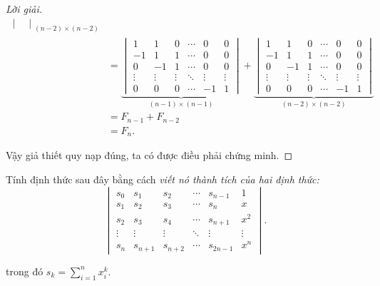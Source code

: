 \documentclass[class=nhvh-linear-algebra,crop=false]{standalone}
\begin{document}
\begin{proof}[Lời giải]
\begin{align*}
{\begin{vmatrix}
			            \end{vmatrix}}_{(n-2)\times (n-2)} \\
		 & =
		\underbrace{\begin{vmatrix}
				            1      & 1      & 0      & \cdots & 0      & 0      \\
				            -1     & 1      & 1      & \cdots & 0      & 0      \\
				            0      & -1     & 1      & \cdots & 0      & 0      \\
				            \vdots & \vdots & \vdots & \ddots & \vdots & \vdots \\
				            0      & 0      & 0      & \cdots & -1     & 1
			            \end{vmatrix}}_{(n-1)\times (n-1)}
		+
		\underbrace{\begin{vmatrix}
				            1      & 1      & 0      & \cdots & 0      & 0      \\
				            -1     & 1      & 1      & \cdots & 0      & 0      \\
				            0      & -1     & 1      & \cdots & 0      & 0      \\
				            \vdots & \vdots & \vdots & \ddots & \vdots & \vdots \\
				            0      & 0      & 0      & \cdots & -1     & 1
			            \end{vmatrix}}_{(n-2)\times (n-2)} \\
		 & = F_{n-1} + F_{n-2}                                          \\
		 & = F_{n}.
	\end{align*}
	\endgroup{}
	\par Vậy giả thiết quy nạp đúng, ta có được điều phải chứng minh.
\end{proof}

\begin{exercise}
	\par Tính định thức sau đây bằng cách \textit{viết nó thành tích của hai định thức:}
	\[
		\begin{vmatrix}
			s_{0}  & s_{1}   & s_{2}   & \cdots & s_{n-1}  & 1      \\
			s_{1}  & s_{2}   & s_{3}   & \cdots & s_{n}    & x      \\
			s_{2}  & s_{3}   & s_{4}   & \cdots & s_{n+1}  & x^{2}  \\
			\vdots & \vdots  & \vdots  & \ddots & \vdots   & \vdots \\
			s_{n}  & s_{n+1} & s_{n+2} & \cdots & s_{2n-1} & x^{n}
		\end{vmatrix}.
	\]
	\par trong đó $s_{k} = \displaystyle\sum^{n}_{i=1}x_{i}^{k}$.
\end{exercise}
\end{document}

